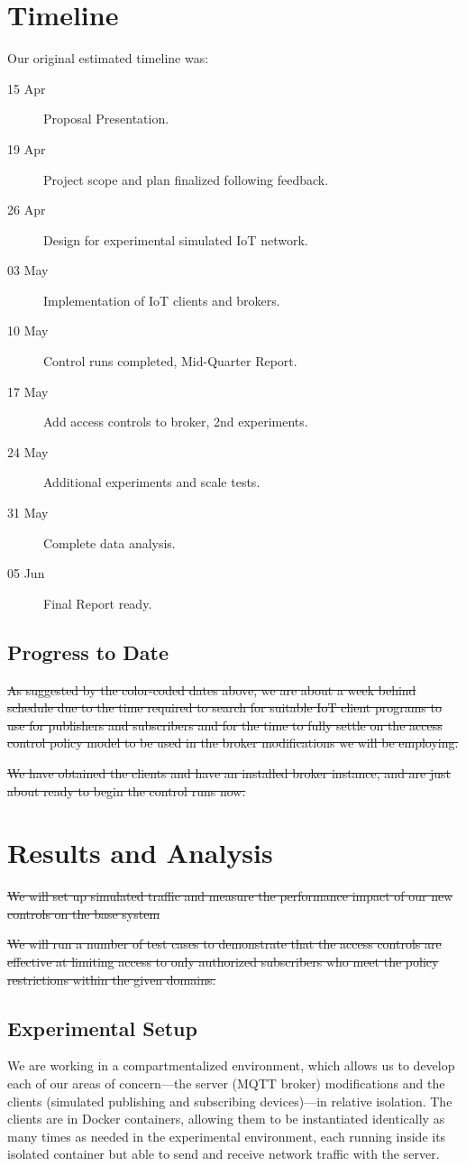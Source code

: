 \documentclass[sigconf, nonacm]{acmart}
\begin{document}
\section{Timeline}
Our original estimated timeline was:
\begin{description}
	\item[\color{ontrack}15 Apr] Proposal Presentation.
	\item[\color{ontrack}19 Apr] Project scope and plan finalized following feedback.
	\item[\color{ontrack}26 Apr] Design for experimental simulated IoT network.
	\item[\color{ontrack}03 May] Implementation of IoT clients and brokers.
	\item[\color{behind}10 May] Control runs completed, Mid-Quarter Report.
	\item[\color{atrisk}17 May] Add access controls to broker, 2nd experiments.
	\item[\color{atrisk}24 May] Additional experiments and scale tests.
	\item[31 May] Complete data analysis.
	\item[05 Jun] Final Report ready.
\end{description}
\subsection{Progress to Date}
\sout{As suggested by the color-coded dates above, we are about a week behind schedule due to the time
required to search for suitable IoT client programs to use for publishers and subscribers and for
the time to fully settle on the access control policy model to be used in the broker modifications
we will be employing.}

\sout{We have obtained the clients and have an installed broker instance, and are just about ready to begin the
control runs now.}

\section{Results and Analysis}
\sout{We will set up simulated traffic and measure the performance impact of our new
controls on the base system}

\sout{We will run a number of test cases to demonstrate that the access controls are effective
at limiting access to only authorized subscribers who meet the policy restrictions within
the given domains.}

\subsection{Experimental Setup}
We are working in a compartmentalized environment, which allows us to develop each of our areas of concern---the server (MQTT broker) modifications and the clients (simulated publishing and subscribing devices)---in relative isolation. The clients
are in Docker containers, allowing them to be instantiated identically as many times as needed in the experimental environment, each running inside its isolated container but able to send and receive network traffic with the server.
\end{document}
